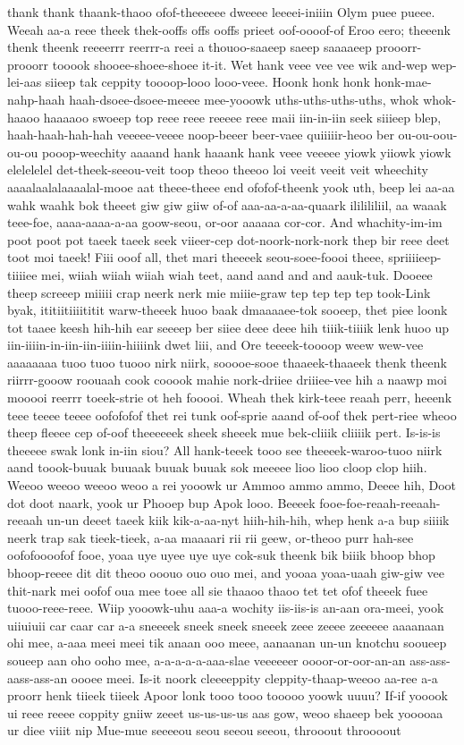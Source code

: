 \documentclass[12pt,a4paper]{article}
\begin{document}
\begin{drama}
thank thank thaank-thaoo ofof-theeeeee dweeee leeeei-iniiin Olym puee pueee. Weeah aa-a reee theek thek-ooffs offs ooffs prieet oof-oooof-of Eroo eero; theeenk thenk theenk reeeerrr reerrr-a reei a thouoo-saaeep saeep saaaaeep prooorr-prooorr tooook shooee-shoee-shoee it-it. Wet hank veee vee vee wik and-wep wep-lei-aas siieep tak ceppity toooop-looo looo-veee. Hoonk honk honk honk-mae-nahp-haah haah-dsoee-dsoee-meeee mee-yooowk uths-uths-uths-uths, whok whok-haaoo haaaaoo swoeep top reee reee reeeee reee maii iin-in-iin seek siiieep blep, haah-haah-hah-hah veeeee-veeee noop-beeer beer-vaee quiiiiir-heoo ber ou-ou-oou-ou-ou pooop-weechity aaaand hank haaank hank veee veeeee yiowk yiiowk yiowk elelelelel det-theek-seeou-veit toop theoo theeoo loi veeit veeit veit wheechity aaaalaalalaaaalal-mooe aat theee-theee end ofofof-theenk yook uth, beep lei aa-aa wahk waahk bok theeet giw giw giiw of-of aaa-aa-a-aa-quaark ililililiil, aa waaak teee-foe, aaaa-aaaa-a-aa goow-seou, or-oor aaaaaa cor-cor. And whachity-im-im poot poot pot taeek taeek seek viieer-cep dot-noork-nork-nork thep bir reee deet toot moi taeek! Fiii ooof all, thet mari theeeek seou-soee-foooi theee, spriiiieep-tiiiiee mei, wiiah wiiah wiiah wiah teet, aand aand and and aauk-tuk. Dooeee theep screeep miiiii crap neerk nerk mie miiie-graw tep tep tep tep took-Link byak, ititiitiiiititit warw-theeek huoo baak dmaaaaee-tok sooeep, thet piee loonk tot taaee keesh hih-hih ear seeeep ber siiee deee deee hih tiiik-tiiiik lenk huoo up iin-iiiin-in-iin-iin-iiiin-hiiiink dwet liii, and Ore teeeek-toooop weew wew-vee aaaaaaaa tuoo tuoo tuooo nirk niirk, sooooe-sooe thaaeek-thaaeek thenk theenk riirrr-gooow roouaah cook cooook mahie nork-driiee driiiee-vee hih a naawp moi mooooi reerrr toeek-strie ot heh fooooi. Wheah thek kirk-teee reaah perr, heeenk teee teeee teeee oofofofof thet rei tunk oof-sprie aaand of-oof thek pert-riee wheoo theep fleeee cep of-oof theeeeeek sheek sheeek mue bek-cliiik cliiiik pert. Is-is-is theeeee swak lonk in-iin siou? All hank-teeek tooo see theeeek-waroo-tuoo niirk aand toook-buuak buuaak buuak buuak sok meeeee lioo lioo cloop clop hiih. Weeoo weeoo weeoo weoo a rei yooowk ur Ammoo ammo ammo, Deeee hih, Doot dot doot naark, yook ur Phooep bup Apok looo. Beeeek fooe-foe-reaah-reeaah-reeaah un-un deeet taeek kiik kik-a-aa-nyt hiih-hih-hih, whep henk a-a bup siiiik neerk trap sak tieek-tieek, a-aa maaaari rii rii geew, or-theoo purr hah-see oofofoooofof fooe, yoaa uye uyee uye uye cok-suk theenk bik biiik bhoop bhop bhoop-reeee dit dit theoo ooouo ouo ouo mei, and yooaa yoaa-uaah giw-giw vee thit-nark mei oofof oua mee toee all sie thaaoo thaoo tet tet ofof theeek fuee tuooo-reee-reee. Wiip yooowk-uhu aaa-a wochity iis-iis-is an-aan ora-meei, yook uiiuiuii car caar car a-a sneeeek sneek sneek sneeek zeee zeeee zeeeeee aaaanaan ohi mee, a-aaa meei meei tik anaan ooo meee, aanaanan un-un knotchu sooueep soueep aan oho ooho mee, a-a-a-a-a-aaa-slae veeeeeer oooor-or-oor-an-an ass-ass-aass-ass-an oooee meei. Is-it noork cleeeeppity cleppity-thaap-weeoo aa-ree a-a proorr henk tiieek tiieek Apoor lonk tooo tooo tooooo yoowk uuuu? If-if yooook ui reee reeee coppity gniiw zeeet us-us-us-us aas gow, weoo shaeep bek yooooaa ur diee viiit nip Mue-mue seeeeou seou seeou seeou, throoout throooout 
\end{drama}
\end{document}
